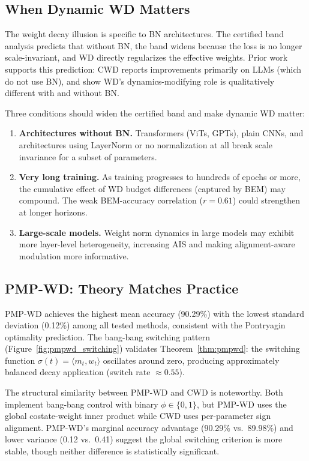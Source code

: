 \documentclass{article}
\begin{document}
\subsection{When Dynamic WD Matters}

The weight decay illusion is specific to BN architectures. The certified band analysis predicts that without BN, the band widens because the loss is no longer scale-invariant, and WD directly regularizes the effective weights. Prior work supports this prediction: CWD \citep{chen2026cwd} reports improvements primarily on LLMs (which do not use BN), and \citet{dangelo2024bn_wd} show WD's dynamics-modifying role is qualitatively different with and without BN.

Three conditions should widen the certified band and make dynamic WD matter:

\begin{enumerate}
\item \textbf{Architectures without BN.} Transformers (ViTs, GPTs), plain CNNs, and architectures using LayerNorm or no normalization at all break scale invariance for a subset of parameters.
\item \textbf{Very long training.} As training progresses to hundreds of epochs or more, the cumulative effect of WD budget differences (captured by BEM) may compound. The weak BEM-accuracy correlation ($r = 0.61$) could strengthen at longer horizons.
\item \textbf{Large-scale models.} Weight norm dynamics in large models may exhibit more layer-level heterogeneity, increasing AIS and making alignment-aware modulation more informative.
\end{enumerate}

\subsection{PMP-WD: Theory Matches Practice}

PMP-WD achieves the highest mean accuracy (90.29\%) with the lowest standard deviation (0.12\%) among all tested methods, consistent with the Pontryagin optimality prediction. The bang-bang switching pattern (Figure~\ref{fig:pmpwd_switching}) validates Theorem~\ref{thm:pmpwd}: the switching function $\sigma(t) = \langle m_t, w_t \rangle$ oscillates around zero, producing approximately balanced decay application (switch rate $\approx 0.55$).

The structural similarity between PMP-WD and CWD is noteworthy. Both implement bang-bang control with binary $\phi \in \{0, 1\}$, but PMP-WD uses the global costate-weight inner product while CWD uses per-parameter sign alignment. PMP-WD's marginal accuracy advantage (90.29\% vs.\ 89.98\%) and lower variance (0.12 vs.\ 0.41) suggest the global switching criterion is more stable, though neither difference is statistically significant.
\end{document}
